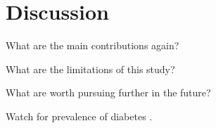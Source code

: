 \documentclass[12pt]{article}
\begin{document}
\section{Discussion}\label{sec:disc}

What are the main contributions again?

What are the limitations of this study?

What are worth pursuing further in the future?

\lipsum[1]
Watch for prevalence of diabetes \citep{wild2004global}.
\citet{wild2004global}

\appendix



\end{document}

